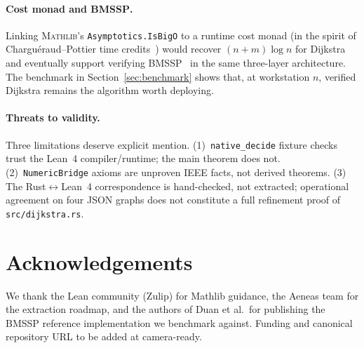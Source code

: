 \documentclass[11pt,a4paper]{article}
\providecommand{\cref}[1]{Section~\ref{#1}}
\newcommand{\Lean}{Lean~4\xspace}
\newcommand{\Mathlib}{\textsc{Mathlib}\xspace}
\newcommand{\BMSSP}{\textsc{BMSSP}\xspace}
\newcommand{\Dijkstra}{Dijkstra\xspace}
\newcommand{\code}[1]{\texttt{#1}}
\theoremstyle{plain}
\theoremstyle{definition}
\begin{document}
\paragraph*{Cost monad and \BMSSP.}
Linking \Mathlib's \code{Asymptotics.IsBigO} to a runtime cost monad (in the
spirit of Charguéraud--Pottier time
credits~\cite{CharguraudPottier2015UnionFind,GueneauChargueraudPottier2018ESOP})
would recover $(n+m)\log n$ for \Dijkstra{} and eventually support verifying
\BMSSP{}~\cite{DuanMaoMaoShuYin2025} in the same three-layer architecture.
The benchmark in \cref{sec:benchmark} shows that, at workstation $n$, verified
\Dijkstra{} remains the algorithm worth deploying.

\paragraph*{Threats to validity.}
Three limitations deserve explicit mention.
(1)~\code{native\_decide} fixture checks trust the \Lean{} compiler/runtime;
the main theorem does not.
(2)~\code{NumericBridge} axioms are unproven IEEE facts, not derived theorems.
(3) The Rust$\leftrightarrow$\Lean{} correspondence is hand-checked, not
extracted; operational agreement on four JSON graphs does not constitute a
full refinement proof of \code{src/dijkstra.rs}.

\section*{Acknowledgements}
We thank the Lean community (Zulip) for Mathlib guidance, the Aeneas team for
the extraction roadmap, and the authors of Duan et al.\ for publishing the
\BMSSP{} reference implementation we benchmark against. Funding and canonical
repository URL to be added at camera-ready.



\end{document}
